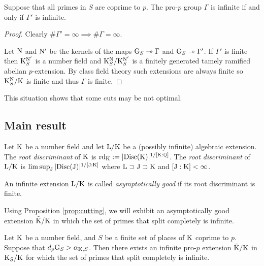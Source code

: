 \documentclass[12pt,a4paper,twoside,english]{smfart}
\def\N{{\rm N}}
\def\G{{\rm G}}
\def\J{{\rm J}}
\def\K{{\rm K}}
\def\L{{\rm L}}
\def\rd{{\rm rd}}
\begin{document}
\begin{prop} Suppose that all primes in $S$ are coprime to $p$.
The pro-$p$ group $\Gamma$ is infinite if and only if $\Gamma'$ is infinite.
\end{prop}
 
\begin{proof}
Clearly $\# \Gamma' = \infty \implies \# \Gamma =\infty$.

Let $\N$ and $\N'$ be the kernels of the maps
$\G_S \twoheadrightarrow \Gamma$ and $\G_S \twoheadrightarrow \Gamma'$.
If $\Gamma'$ is finite   then $\K^{\N'}_S$ is a number field and 
$\K^{\N}_S/\K^{\N'}_S$ is a finitely generated  tamely ramified abelian  $p$-extension.
By class field theory such extensions are always finite so $\K^\N_S/\K$ is finite and thus $\Gamma$ is finite.
\end{proof}
 
 This situation shows that some cuts may be not optimal.







\subsection{Main result}
\begin{defi}
Let $\K$ be a number field and let  $\L/\K$ be a (possibly infinite) algebraic extension. 
The {\it root discriminant} of $\K$ is $\rd_\K := |\rm{Disc}(\K)|^{1/[\K:\mathbb Q]}$. 
The {\it root discriminant} of $\L/\K$ is $\limsup_{\J} |\rm{Disc}(\J)|^{1/[\J:\K]}$ where $\L\supset \J\supset \K$ and
$[\J:\K] < \infty$.
\end{defi}

\begin{defi}
An infinite extension $\L/\K$ is called {\it asymptotically good}  if its root discriminant is finite. 
\end{defi}

Using Proposition \ref{prop:cutting}, we will exhibit  
an asymptotically good extension ${\tilde \K}/\K$
  in which the set of primes that split completely is infinite. 
 \smallskip


\begin{theo} \label{theo:ihara} Let $\K$ be a number field, and $S$ be a finite set of places of $\K$ coprime to $p$.  Suppose  that $d_p \G_S > \alpha_{\K,S}$. Then there exists an  infinite  pro-$p$ extension ${\tilde \K}/\K$ in $\K_S/\K$ for which the  set of primes that split completely  is infinite. 
\end{theo} 
\end{document}
